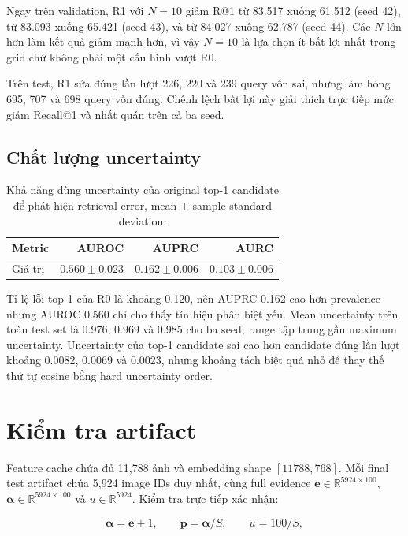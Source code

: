 \documentclass[11pt,a4paper]{article}
\begin{document}
Ngay trên validation, R1 với $N=10$ giảm R@1 từ 83.517 xuống 61.512
(seed 42), từ 83.093 xuống 65.421 (seed 43), và từ 84.027 xuống 62.787
(seed 44). Các $N$ lớn hơn làm kết quả giảm mạnh hơn, vì vậy $N=10$ là
lựa chọn ít bất lợi nhất trong grid chứ không phải một cấu hình vượt R0.

Trên test, R1 sửa đúng lần lượt 226, 220 và 239 query vốn sai, nhưng làm
hỏng 695, 707 và 698 query vốn đúng. Chênh lệch bất lợi này giải thích
trực tiếp mức giảm Recall@1 và nhất quán trên cả ba seed.

\subsection{Chất lượng uncertainty}

\begin{table}[h]
\centering
\caption{Khả năng dùng uncertainty của original top-1 candidate để phát
hiện retrieval error, mean $\pm$ sample standard deviation.}
\begin{tabular}{lrrr}
\toprule
Metric & AUROC & AUPRC & AURC \\
\midrule
Giá trị & $0.560\pm0.023$ & $0.162\pm0.006$ & $0.103\pm0.006$ \\
\bottomrule
\end{tabular}
\end{table}

Tỉ lệ lỗi top-1 của R0 là khoảng 0.120, nên AUPRC 0.162 cao hơn prevalence
nhưng AUROC 0.560 chỉ cho thấy tín hiệu phân biệt yếu. Mean uncertainty
trên toàn test set là 0.976, 0.969 và 0.985 cho ba seed; range tập trung
gần maximum uncertainty. Uncertainty của top-1 candidate sai cao hơn
candidate đúng lần lượt khoảng 0.0082, 0.0069 và 0.0023, nhưng khoảng
tách biệt quá nhỏ để thay thế thứ tự cosine bằng hard uncertainty order.

\section{Kiểm tra artifact}

Feature cache chứa đủ 11,788 ảnh và embedding shape
$[11788,768]$. Mỗi final test artifact chứa 5,924 image IDs duy nhất,
cùng full evidence $\mathbf e\in\mathbb{R}^{5924\times100}$,
$\boldsymbol\alpha\in\mathbb{R}^{5924\times100}$ và
$u\in\mathbb{R}^{5924}$. Kiểm tra trực tiếp xác nhận:

\begin{equation}
\boldsymbol\alpha=\mathbf e+1,\qquad
\mathbf p=\boldsymbol\alpha/S,\qquad
u=100/S,
\end{equation}
\end{document}
